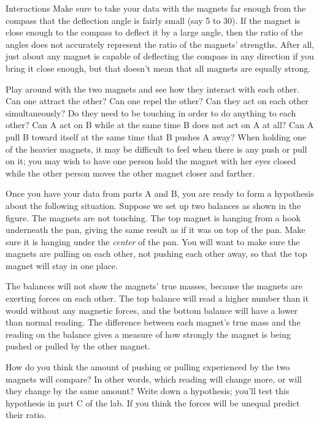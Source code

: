 \begin{lab}{Interactions}
Make sure
to take your data with the magnets far enough from the
compass that the deflection angle is fairly small (say 5 to
30\degunit).  If the magnet is close enough to the compass
to deflect it by a large angle, then the ratio of the angles
does not accurately represent the ratio of the magnets'
strengths. After all, just about any magnet is capable of
deflecting the compass in any direction if you bring it
close enough, but that doesn't mean that all magnets are
equally strong.


Play around with the two magnets and see how they interact
with each other. Can one attract the other?  Can one repel
the other?  Can they act on each other simultaneously? Do
they need to be touching in order to do anything to each
other?   Can A act on B while at the same time B does
not act on A at all?  Can A pull B toward itself at the
same time that B pushes A away?  When holding one of the
heavier magnets, it may be difficult to feel when there is
any push or pull on it; you may wish to have one person hold
the magnet with her eyes closed while the other person moves
the other magnet closer and farther.


Once you have your data from parts A and B, you are
ready to form a hypothesis about the following situation. 
Suppose we set up two balances as shown in the figure.  The
magnets are not touching.  The top magnet is hanging from a
hook underneath the pan, giving the same result as if it was
on top of the pan.  Make sure it is hanging under the
\emph{center} of the pan. You will want to make sure the
magnets are pulling on each other, not pushing each other
away, so that the top magnet will stay in one place.


The balances will not show the magnets' true masses, because
the magnets are exerting forces on each other.  The top
balance will read a higher number than it would without any
magnetic forces, and the bottom balance will have a lower
than normal reading.  The difference between each magnet's
true mass and the reading on the balance gives a measure of
how strongly the magnet is being pushed or pulled by the other magnet.

How do you think the amount of pushing or pulling experienced
by the two magnets will compare?  In other words, which
reading will change more, or will they change by the same
amount?  Write down a hypothesis;  you'll test this
hypothesis in part C of the lab. If you think the forces
will be unequal predict their ratio.


\end{lab}
